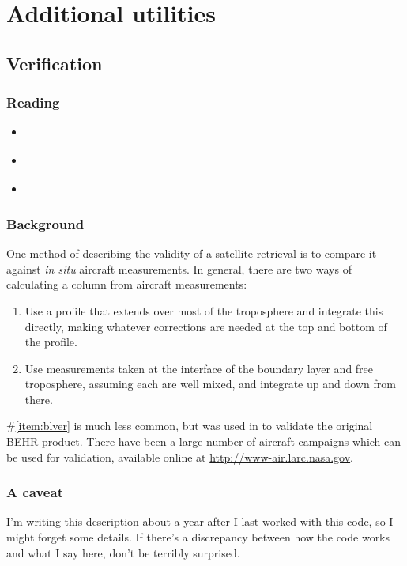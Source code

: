 \documentclass[12pt]{article}
\begin{document}
\section{Additional utilities}
	\subsection{Verification}
		\subsubsection{Reading}
		\begin{itemize}
		\item \citealt{bucsela08}
		\item \citealt{hains10}
		\item \citealt{russell11}
		\end{itemize}
		
		\subsubsection{Background}
		One method of describing the validity of a satellite retrieval is to compare it against \emph{in situ} aircraft measurements. In general, there are two ways of calculating a column from aircraft measurements:
		\begin{enumerate}
		\item Use a profile that extends over most of the troposphere and integrate this directly, making whatever corrections are needed at the top and bottom of the profile.
		\item \label{item:blver} Use measurements taken at the interface of the boundary layer and free troposphere, assuming each are well mixed, and integrate up and down from there.
		\end{enumerate}
		
		\#\ref{item:blver} is much less common, but was used in \citet{russell11} to validate the original BEHR product.  There have been a large number of aircraft campaigns which can be used for validation, available online at \url{http://www-air.larc.nasa.gov}.
		
		\subsubsection{A caveat}
		I'm writing this description about a year after I last worked with this code, so I might forget some details. If there's a discrepancy between how the code works and what I say here, don't be terribly surprised.
		
\end{document}
